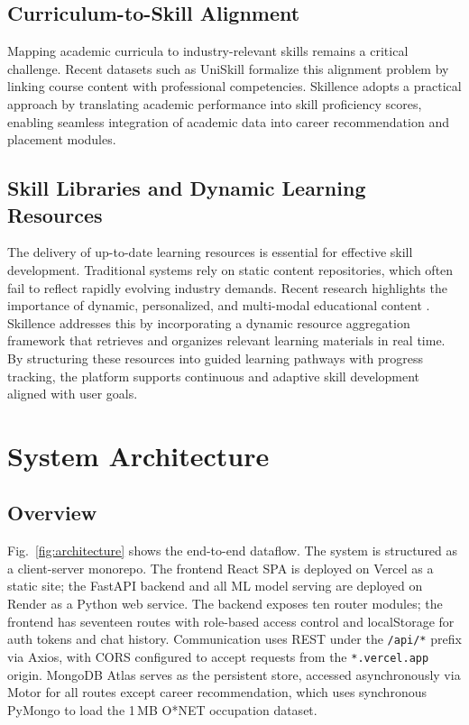 \documentclass[conference]{IEEEtran}
\begin{document}
\subsection{Curriculum-to-Skill Alignment}
Mapping academic curricula to industry-relevant skills remains a critical challenge. Recent datasets such as UniSkill \cite{uniskill2025} formalize this alignment problem by linking course content with professional competencies. Skillence adopts a practical approach by translating academic performance into skill proficiency scores, enabling seamless integration of academic data into career recommendation and placement modules.

\subsection{Skill Libraries and Dynamic Learning Resources}
The delivery of up-to-date learning resources is essential for effective skill development. Traditional systems rely on static content repositories, which often fail to reflect rapidly evolving industry demands. Recent research highlights the importance of dynamic, personalized, and multi-modal educational content \cite{preethika2025, li2025}. Skillence addresses this by incorporating a dynamic resource aggregation framework that retrieves and organizes relevant learning materials in real time. By structuring these resources into guided learning pathways with progress tracking, the platform supports continuous and adaptive skill development aligned with user goals.

\section{System Architecture}

\subsection{Overview}
Fig.~\ref{fig:architecture} shows the end-to-end dataflow. The system
is structured as a client-server monorepo. The frontend React SPA is
deployed on Vercel as a static site; the FastAPI backend and all ML
model serving are deployed on Render as a Python web service. The
backend exposes ten router modules; the frontend has seventeen routes
with role-based access control and localStorage for auth tokens and
chat history. Communication uses REST under the \texttt{/api/*} prefix
via Axios, with CORS configured to accept requests from the
\texttt{*.vercel.app} origin. MongoDB Atlas serves as the persistent
store, accessed asynchronously via Motor for all routes except career
recommendation, which uses synchronous PyMongo to load the 1\,MB
O*NET occupation dataset.
\end{document}
